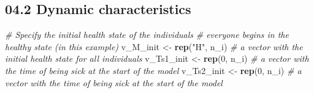 \documentclass[
]{article}
\newenvironment{Shaded}{\begin{snugshade}}{\end{snugshade}}
\newcommand{\CommentTok}[1]{\textcolor[rgb]{0.56,0.35,0.01}{\textit{#1}}}
\newcommand{\DataTypeTok}[1]{\textcolor[rgb]{0.13,0.29,0.53}{#1}}
\newcommand{\DecValTok}[1]{\textcolor[rgb]{0.00,0.00,0.81}{#1}}
\newcommand{\KeywordTok}[1]{\textcolor[rgb]{0.13,0.29,0.53}{\textbf{#1}}}
\newcommand{\NormalTok}[1]{#1}
\newcommand{\OperatorTok}[1]{\textcolor[rgb]{0.81,0.36,0.00}{\textbf{#1}}}
\newcommand{\StringTok}[1]{\textcolor[rgb]{0.31,0.60,0.02}{#1}}
\begin{document}
\begin{Shaded}
\end{Shaded}

\hypertarget{dynamic-characteristics}{%
\subsection{04.2 Dynamic
characteristics}\label{dynamic-characteristics}}

\begin{Shaded}
\begin{Highlighting}[]
\CommentTok{# Specify the initial health state of the individuals }
\CommentTok{# everyone begins in the healthy state (in this example)}
\NormalTok{v_M_init   <-}\StringTok{ }\KeywordTok{rep}\NormalTok{(}\StringTok{"H"}\NormalTok{, n_i) }\CommentTok{# a vector with the initial health state for all individuals }
\NormalTok{v_Ts1_init <-}\StringTok{ }\KeywordTok{rep}\NormalTok{(}\DecValTok{0}\NormalTok{, n_i)   }\CommentTok{# a vector with the time of being sick at the start of the model }
\NormalTok{v_Ts2_init <-}\StringTok{ }\KeywordTok{rep}\NormalTok{(}\DecValTok{0}\NormalTok{, n_i)   }\CommentTok{# a vector with the time of being sick at the start of the model   }
\end{Highlighting}
\end{Shaded}
\end{document}
